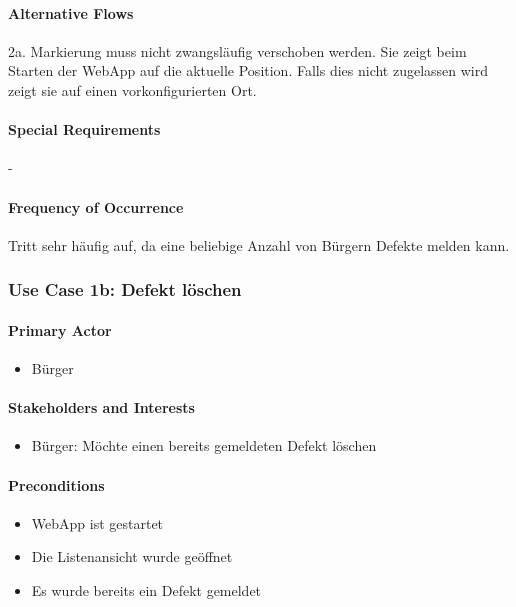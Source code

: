 \paragraph{Alternative Flows}
2a. Markierung muss nicht zwangsläufig verschoben werden. Sie zeigt beim Starten der WebApp auf die aktuelle Position. Falls dies nicht zugelassen wird zeigt sie auf einen vorkonfigurierten Ort.

\paragraph{Special Requirements}
-

\paragraph{Frequency of Occurrence}
Tritt sehr häufig auf, da eine beliebige Anzahl von Bürgern Defekte melden kann.

\subsubsection{Use Case 1b: Defekt löschen}
\paragraph{Primary Actor}
\begin{itemize}
\item Bürger
\end{itemize}

\paragraph{Stakeholders and Interests}
\begin{itemize}
\item Bürger: Möchte einen bereits gemeldeten Defekt löschen
\end{itemize}

\paragraph{Preconditions}
\begin{itemize}
\item WebApp ist gestartet
\item Die Listenansicht wurde geöffnet 
\item Es wurde bereits ein Defekt gemeldet
\end{itemize}

